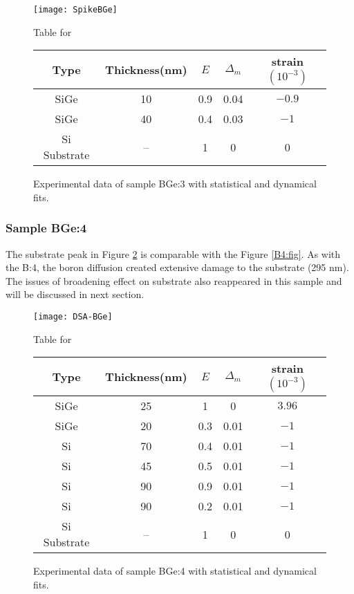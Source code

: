 \begin{figure}[ht]%
\caption{Experimental data of sample BGe:3 with statistical and dynamical fits.}
\label{BGe3:fig}
\begin{minipage}{\linewidth}
\texttt{[image: SpikeBGe]}
\end{minipage}
\begin{minipage}{\linewidth}
\centering
\vspace{10pt}
Table for \\
\begin{tabular}[htbp]{@{}c|cccc@{}}
    \hline
  Type & Thickness(nm) & $E$ & $\Delta_m$ & strain $(10^{-3})$ \\
    \hline
  SiGe & 10 & 0.9 & 0.04 & $-0.9$  \\
  SiGe & 40 & 0.4 & 0.03 & $-1 $  \\
  Si Substrate & -- & 1 & 0 & 0 
  \end{tabular}
\end{minipage}
\end{figure}

\subsubsection{Sample BGe:4}

The substrate peak in Figure \ref{BGe4:fig} is comparable with the Figure \ref{B4:fig}.  As with the B:4, the boron diffusion created extensive damage to the substrate (295 nm).  The issues of broadening effect on substrate also reappeared in this sample and will be discussed in next section.

\begin{figure}[ht]%
\caption{Experimental data of sample BGe:4 with statistical and dynamical fits.}
\label{BGe4:fig}
\begin{minipage}{\linewidth}
\texttt{[image: DSA-BGe]}
\end{minipage}
\begin{minipage}{\linewidth}
\centering
\vspace{10pt}
Table for \\
\begin{tabular}[htbp]{@{}c|cccc@{}}
    \hline
  Type & Thickness(nm) & $E$ & $\Delta_m$ & strain $(10^{-3})$ \\
    \hline
  SiGe 	& 25 & 1   & 0    & $3.96 $  \\
  SiGe 	& 20 & 0.3 & 0.01 & $-1 	$  \\
  Si   	& 70 & 0.4 & 0.01 & $-1		$ \\
  Si 		& 45 & 0.5 & 0.01 & $-1		$\\
  Si 		& 90 & 0.9 & 0.01 & $-1		$\\
  Si 		& 90 & 0.2 & 0.01 & $-1		$\\
  Si Substrate & -- & 1 & 0 & 0 
  \end{tabular}
\end{minipage}
\end{figure}

